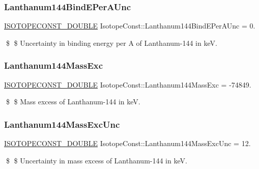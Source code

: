 \subsubsection{\texorpdfstring{Lanthanum144\+Bind\+E\+Per\+A\+Unc}{Lanthanum144BindEPerAUnc}}
{\footnotesize\ttfamily \mbox{\hyperlink{group___isotope_const-_macros_ga8f45a7272ce02c0b4c65c44636ed719a}{I\+S\+O\+T\+O\+P\+E\+C\+O\+N\+S\+T\+\_\+\+D\+O\+U\+B\+LE}} Isotope\+Const\+::\+Lanthanum144\+Bind\+E\+Per\+A\+Unc = 0.}

\$ \$ Uncertainty in binding energy per A of Lanthanum-\/144 in keV. \mbox{\label{group___isotope_const-_lanthanum-_la144_ga81926dea281559fbea833565e7142781}} 
\subsubsection{\texorpdfstring{Lanthanum144\+Mass\+Exc}{Lanthanum144MassExc}}
{\footnotesize\ttfamily \mbox{\hyperlink{group___isotope_const-_macros_ga8f45a7272ce02c0b4c65c44636ed719a}{I\+S\+O\+T\+O\+P\+E\+C\+O\+N\+S\+T\+\_\+\+D\+O\+U\+B\+LE}} Isotope\+Const\+::\+Lanthanum144\+Mass\+Exc = -\/74849.}

\$ \$ Mass excess of Lanthanum-\/144 in keV. \mbox{\label{group___isotope_const-_lanthanum-_la144_ga8d04d99f92336dac9735d1a4fc9dba73}} 
\subsubsection{\texorpdfstring{Lanthanum144\+Mass\+Exc\+Unc}{Lanthanum144MassExcUnc}}
{\footnotesize\ttfamily \mbox{\hyperlink{group___isotope_const-_macros_ga8f45a7272ce02c0b4c65c44636ed719a}{I\+S\+O\+T\+O\+P\+E\+C\+O\+N\+S\+T\+\_\+\+D\+O\+U\+B\+LE}} Isotope\+Const\+::\+Lanthanum144\+Mass\+Exc\+Unc = 12.}

\$ \$ Uncertainty in mass excess of Lanthanum-\/144 in keV. \mbox{\label{group___isotope_const-_lanthanum-_la144_ga95d9c66ba06ad6ac52844ba60c74f1e4}} 
